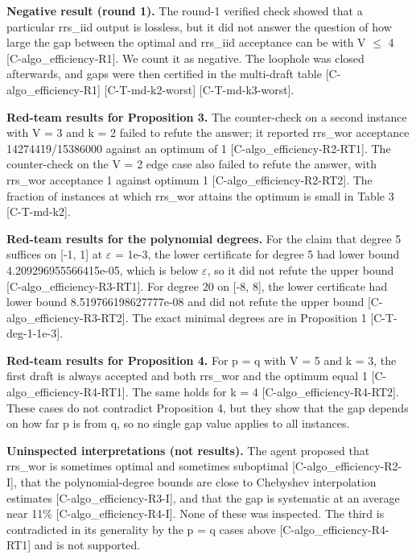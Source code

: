 \documentclass[10pt,twocolumn]{article}
\begin{document}
\textbf{Negative result (round 1).} The round-1 verified check showed that a particular rrs\_iid output is lossless, but it did not answer the question of how large the gap between the optimal and rrs\_iid acceptance can be with V $\le$ 4 {\scriptsize[C-algo\_efficiency-R1]}. We count it as negative. The loophole was closed afterwards, and gaps were then certified in the multi-draft table {\scriptsize[C-algo\_efficiency-R1]} {\scriptsize[C-T-md-k2-worst]} {\scriptsize[C-T-md-k3-worst]}.

\textbf{Red-team results for Proposition 3.} The counter-check on a second instance with V = 3 and k = 2 failed to refute the answer; it reported rrs\_wor acceptance 14274419/15386000 against an optimum of 1 {\scriptsize[C-algo\_efficiency-R2-RT1]}. The counter-check on the V = 2 edge case also failed to refute the answer, with rrs\_wor acceptance 1 against optimum 1 {\scriptsize[C-algo\_efficiency-R2-RT2]}. The fraction of instances at which rrs\_wor attains the optimum is small in Table 3 {\scriptsize[C-T-md-k2]}.

\textbf{Red-team results for the polynomial degrees.} For the claim that degree 5 suffices on [-1, 1] at $\varepsilon$ = 1e-3, the lower certificate for degree 5 had lower bound 4.209296955566415e-05, which is below $\varepsilon$, so it did not refute the upper bound {\scriptsize[C-algo\_efficiency-R3-RT1]}. For degree 20 on [-8, 8], the lower certificate had lower bound 8.519766198627777e-08 and did not refute the upper bound {\scriptsize[C-algo\_efficiency-R3-RT2]}. The exact minimal degrees are in Proposition 1 {\scriptsize[C-T-deg-1-1e-3]}.

\textbf{Red-team results for Proposition 4.} For p = q with V = 5 and k = 3, the first draft is always accepted and both rrs\_wor and the optimum equal 1 {\scriptsize[C-algo\_efficiency-R4-RT1]}. The same holds for k = 4 {\scriptsize[C-algo\_efficiency-R4-RT2]}. These cases do not contradict Proposition 4, but they show that the gap depends on how far p is from q, so no single gap value applies to all instances.

\textbf{Uninspected interpretations (not results).} The agent proposed that rrs\_wor is sometimes optimal and sometimes suboptimal {\scriptsize[C-algo\_efficiency-R2-I]}, that the polynomial-degree bounds are close to Chebyshev interpolation estimates {\scriptsize[C-algo\_efficiency-R3-I]}, and that the gap is systematic at an average near 11\% {\scriptsize[C-algo\_efficiency-R4-I]}. None of these was inspected. The third is contradicted in its generality by the p = q cases above {\scriptsize[C-algo\_efficiency-R4-RT1]} and is not supported.
\end{document}
